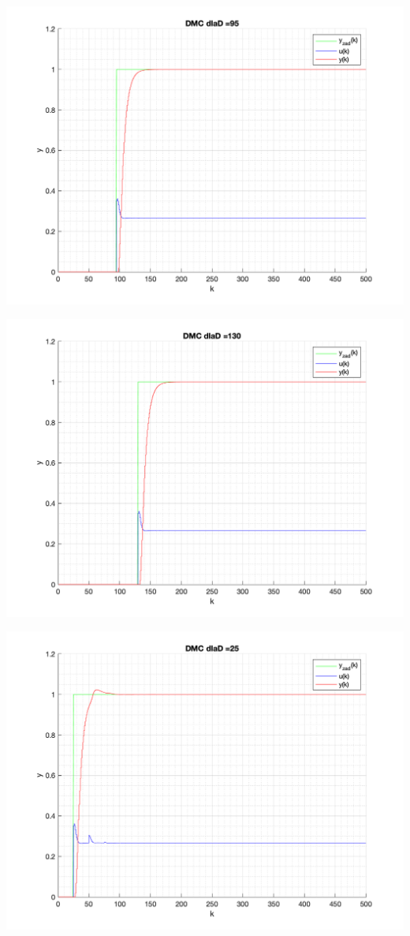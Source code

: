 \documentclass[a4paper, 11pt]{article}
\begin{document}
\begin{enumerate}
 \includegraphics[width=\linewidth]{./ModelsP4_D/P4_DMC_D_95_png.png} 
 
 \includegraphics[width=\linewidth]{./ModelsP4_D/P4_DMC_D_130_png.png} 
 
 \includegraphics[width=\linewidth]{./ModelsP4_D/P4_DMC_D_25_png.png} 
 

\end{enumerate}
\end{document}
